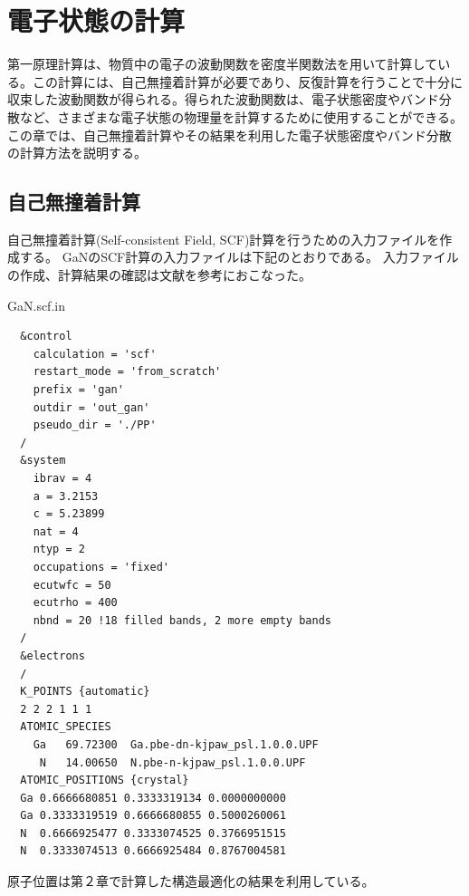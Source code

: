 \chapter{電子状態の計算}
\begin{summary}
第一原理計算は、物質中の電子の波動関数を密度半関数法を用いて計算している。この計算には、自己無撞着計算が必要であり、反復計算を行うことで十分に収束した波動関数が得られる。得られた波動関数は、電子状態密度やバンド分散など、さまざまな電子状態の物理量を計算するために使用することができる。この章では、自己無撞着計算やその結果を利用した電子状態密度やバンド分散の計算方法を説明する。
\end{summary}

\newpage

\section{自己無撞着計算}
自己無撞着計算(Self-consistent Field, SCF)計算を行うための入力ファイルを作成する。
GaNのSCF計算の入力ファイルは下記のとおりである。
入力ファイルの作成、計算結果の確認は文献\cite{maezono_DFT}を参考におこなった。

\begin{example}{GaN.scf.in}
\begin{verbatim}
  &control
    calculation = 'scf'
    restart_mode = 'from_scratch'
    prefix = 'gan'
    outdir = 'out_gan'
    pseudo_dir = './PP'
  /
  &system
    ibrav = 4
    a = 3.2153
    c = 5.23899
    nat = 4
    ntyp = 2
    occupations = 'fixed'
    ecutwfc = 50
    ecutrho = 400
    nbnd = 20 !18 filled bands, 2 more empty bands
  /
  &electrons
  /
  K_POINTS {automatic}
  2 2 2 1 1 1
  ATOMIC_SPECIES
    Ga   69.72300  Ga.pbe-dn-kjpaw_psl.1.0.0.UPF
     N   14.00650  N.pbe-n-kjpaw_psl.1.0.0.UPF
  ATOMIC_POSITIONS {crystal}
  Ga 0.6666680851 0.3333319134 0.0000000000
  Ga 0.3333319519 0.6666680855 0.5000260061
  N  0.6666925477 0.3333074525 0.3766951515
  N  0.3333074513 0.6666925484 0.8767004581
\end{verbatim}
\end{example}
原子位置は第２章で計算した構造最適化の結果を利用している。


